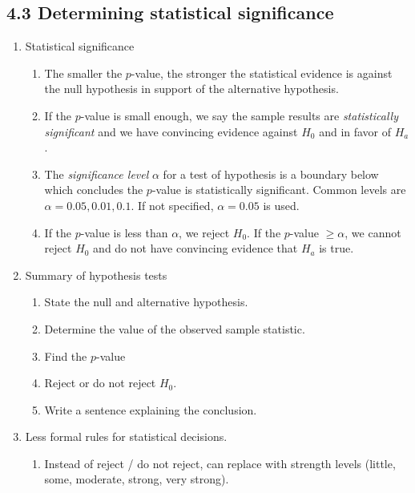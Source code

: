 \documentclass{article}
\begin{document}
\subsection{4.3 Determining statistical significance}
\begin{enumerate}

\item Statistical significance
\begin{enumerate}
\item The smaller the $p$-value, the stronger the statistical evidence is against the null hypothesis in support of the alternative hypothesis.
\item If the $p$-value is small enough, we say the sample results are \emph{statistically significant} and we have convincing evidence against $H_0$ and in favor of $H_a$.
\item The \emph{significance level} $\alpha$ for a test of hypothesis is a boundary below which concludes the $p$-value is statistically significant. Common levels are $\alpha=0.05, 0.01, 0.1$. If not specified, $\alpha=0.05$ is used.
\item If the $p$-value is less than $\alpha$, we reject $H_0$. If the $p$-value $\geq \alpha$, we cannot reject $H_0$ and do not have convincing evidence that $H_a$ is true.
\end{enumerate}

\item Summary of hypothesis tests
\begin{enumerate}
\item State the null and alternative hypothesis. 
\item Determine the value of the observed sample statistic.
\item Find the $p$-value 
\item Reject or do not reject $H_0$.
\item Write a sentence explaining the conclusion.
\end{enumerate}

\item Less formal rules for statistical decisions.
\begin{enumerate}
\item Instead of reject / do not reject, can replace with strength levels (little, some, moderate, strong, very strong).
\end{enumerate}

\end{enumerate}
\end{document}
